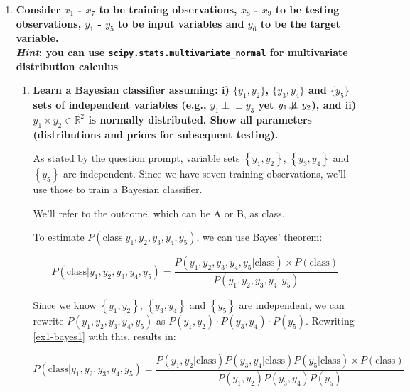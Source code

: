 \documentclass[12pt]{article}
\newcommand{\ind}{\perp\!\!\!\perp}
\begin{document}
\begin{enumerate}[leftmargin=\labelsep]
    \item \textbf{Consider $x_1$ - $x_7$ to be training observations, $x_8$ - $x_9$ to be testing observations, $y_1$ - $y_5$ to be input
          variables and $y_6$ to be the target variable.\\
          \textit{Hint}: you can use \texttt{scipy.stats.multivariate\_normal} for multivariate distribution calculus}
          \begin{enumerate}
          \item \textbf{Learn a Bayesian classifier assuming: i) $\{y_1, y_2\}$, $\{y_3, y_4\}$ and $\{y_5\}$ sets of independent
                variables (e.g., $y_1 \ind y_3$ yet $y_1 \not\!\ind y_2$), and ii) $y_1 \times y_2 \in \mathbb{R}^{2}$ is normally distributed. Show all
                parameters (distributions and priors for subsequent testing).}

          \vskip 0.3cm
          As stated by the question prompt, variable sets \(\left\{y_1, y_2\right\}\), \(\left\{y_3, y_4\right\}\) and \(\left\{y_5\right\}\) are independent.
          Since we have seven training observations, we'll use those to train a Bayesian classifier.

          We'll refer to the outcome, which can be A or B, as class.

          To estimate $P(\text{class} | y_1, y_2, y_3, y_4, y_5)$, we can use Bayes' theorem:

          \begin{equation}\label{ex1-bayes1}
              P(\text{class}| y_1, y_2, y_3, y_4, y_5) = \frac{P(y_1, y_2, y_3, y_4, y_5 | \text{class}) \times P(\text{class})}{P(y_1, y_2, y_3, y_4, y_5)}
          \end{equation}

          Since we know $\left\{y_1, y_2\right\}$, $\left\{y_3, y_4\right\}$ and $\left\{y_5\right\}$ are independent,
          we can rewrite $P(y_1, y_2, y_3, y_4, y_5)$ as $P(y_1, y_2) \cdot P(y_3, y_4) \cdot P(y_5)$.
          Rewriting \eqref{ex1-bayes1} with this, results in:

          \begin{equation}\label{ex1-bayes2}
              P(\text{class}| y_1, y_2, y_3, y_4, y_5) = \frac{P(y_1, y_2 | \text{class}) P(y_3, y_4 | \text{class}) P(y_5 | \text{class}) \times P(\text{class})}{P(y_1, y_2)P(y_3, y_4)P(y_5)}
          \end{equation}


\end{enumerate}
\end{enumerate}
\end{document}
